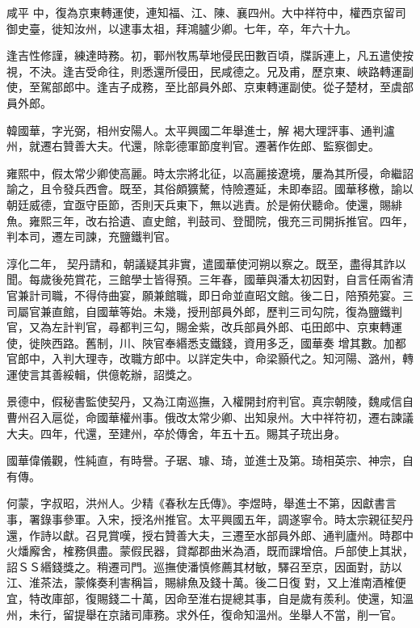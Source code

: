 \begin{pinyinscope}
 咸平
 中，復為京東轉運使，連知福、江、陳、襄四州。大中祥符中，權西京留司御史臺，徙知汝州，以逮事太祖，拜鴻臚少卿。七年，卒，年六十九。



 逢吉性修謹，練達時務。初，鄆州牧馬草地侵民田數百頃，牒訴連上，凡五遣使按視，不決。逢吉受命往，則悉還所侵田，民咸德之。兄及甫，歷京東、峽路轉運副使，至駕部郎中。逢吉子成務，至比部員外郎、京東轉運副使。從子楚材，至虞部員外郎。



 韓國華，字光弼，相州安陽人。太平興國二年舉進士，解
 褐大理評事、通判瀘州，就遷右贊善大夫。代還，除彰德軍節度判官。遷著作佐郎、監察御史。



 雍熙中，假太常少卿使高麗。時太宗將北征，以高麗接遼境，屢為其所侵，命繼詔諭之，且令發兵西會。既至，其俗頗獷驁，恃險遷延，未即奉詔。國華移檄，諭以朝廷威德，宜亟守臣節，否則天兵東下，無以逃責。於是俯伏聽命。使還，賜緋魚。雍熙三年，改右拾遺、直史館，判鼓司、登聞院，俄充三司開拆推官。四年，判本司，遷左司諫，充鹽鐵判官。



 淳化二年，
 契丹請和，朝議疑其非實，遣國華使河朔以察之。既至，盡得其詐以聞。每歲後苑賞花，三館學士皆得預。三年春，國華與潘太初因對，自言任兩省清官兼計司職，不得侍曲宴，願兼館職，即日命並直昭文館。後二日，陪預苑宴。三司屬官兼直館，自國華等始。未幾，授刑部員外郎，歷判三司勾院，復為鹽鐵判官，又為左計判官，尋都判三勾，賜金紫，改兵部員外郎、屯田郎中、京東轉運使，徙陜西路。舊制，川、陜官奉緡悉支鐵錢，資用多乏，國華奏
 增其數。加都官郎中，入判大理寺，改職方郎中。以詳定失中，命梁顥代之。知河陽、潞州，轉運使言其善綏輯，供億乾辦，詔獎之。



 景德中，假秘書監使契丹，又為江南巡撫，入權開封府判官。真宗朝陵，魏咸信自曹州召入扈從，命國華權州事。俄改太常少卿、出知泉州。大中祥符初，遷右諫議大夫。四年，代還，至建州，卒於傳舍，年五十五。賜其子珫出身。



 國華偉儀觀，性純直，有時譽。子琚、璩、琦，並進士及第。琦相英宗、神宗，自有傳。



 何蒙，字叔昭，洪州人。少精《春秋左氏傳》。李煜時，舉進士不第，因獻書言事，署錄事參軍。入宋，授洺州推官。太平興國五年，調遂寧令。時太宗親征契丹還，作詩以獻。召見賞嘆，授右贊善大夫，三遷至水部員外郎、通判廬州。時郡中火燔廨舍，榷務俱盡。蒙假民器，貸鄰郡曲米為酒，既而課增倍。戶部使上其狀，詔ＳＳ緡錢獎之。稍遷司門。巡撫使潘慎修薦其材敏，驛召至京，因面對，訪以江、淮茶法，蒙條奏利害稱旨，賜緋魚及錢十萬。後二日復
 對，又上淮南酒榷便宜，特改庫部，復賜錢二十萬，因命至淮右提總其事，自是歲有羨利。使還，知溫州，未行，留提舉在京諸司庫務。求外任，復命知溫州。坐舉人不當，削一官。




\end{pinyinscope}
